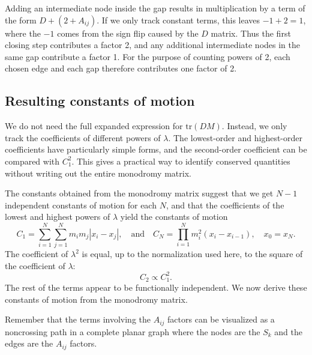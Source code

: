 \documentclass[english,master]{liumaiex}
\theoremstyle{thesisplain}
\theoremstyle{thesisdefinition}
\newcommand{\tr}{\text{tr}}
\numberwithin{equation}{section}
\begin{document}
Adding an intermediate node inside the gap results in multiplication by a term of the form $D + (2 + A_{ij})$. If we only track constant terms, this leaves $-1 + 2 = 1$, where the $-1$ comes from the sign flip caused by the $D$ matrix. Thus the first closing step contributes a factor 2, and any additional intermediate nodes in the same gap contribute a factor 1. For the purpose of counting powers of 2, each chosen edge and each gap therefore contributes one factor of 2.

\subsection{Resulting constants of motion}
We do not need the full expanded expression for $\tr(DM)$. Instead, we only track the coefficients of different powers of $\lambda$. The lowest-order and highest-order coefficients have particularly simple forms, and the second-order coefficient can be compared with $C_1^2$. This gives a practical way to identify conserved quantities without writing out the entire monodromy matrix.

The constants obtained from the monodromy matrix suggest that we get $N-1$ independent constants of motion for each $N$, and that the coefficients of the lowest and highest powers of $\lambda$ yield the constants of motion
\begin{equation}
	C_1 = \sum_{i=1}^{N}\sum_{j=1}^N m_i m_j |x_i - x_j|,
	\quad \text{and} \quad
	C_N = \prod_{i=1}^{N} m_i^2 (x_i - x_{i-1}),
	\quad x_0 = x_N.
\end{equation}
The coefficient of $\lambda^2$ is equal, up to the normalization used here, to the square of the coefficient of $\lambda$:
\begin{equation}
	C_2 \propto C_1^2.
\end{equation}
The rest of the terms appear to be functionally independent. We now derive these constants of motion from the monodromy matrix.

Remember that the terms involving the $A_{ij}$ factors can be visualized as a noncrossing path in a complete planar graph where the nodes are the $S_k$ and the edges are the $A_{ij}$ factors.
\end{document}
